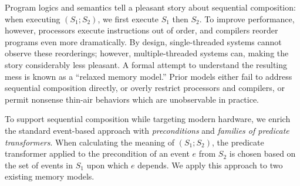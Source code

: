 
Program logics and semantics tell a pleasant story about sequential
composition: when executing $(S_1; S_2)$, we first execute $S_1$ then $S_2$.
To improve performance, however, processors execute instructions out of
order, and compilers reorder programs even more dramatically.  By design,
single-threaded systems cannot observe these reorderings; however,
multiple-threaded systems can, making the story considerably less pleasant.
A formal attempt to understand the resulting mess is known as a ``relaxed
memory model.''  Prior models either fail to address sequential composition
directly, or overly restrict processors and compilers, or permit nonsense
thin-air behaviors which are unobservable in practice.

To support sequential composition while targeting modern hardware, we enrich
the standard event-based approach with \emph{preconditions} and
\emph{families of predicate transformers}.
%
When calculating the meaning of $(S_1;S_2)$, the predicate transformer applied to the
precondition of an event $e$ from ${S_2}$ is chosen based on the set of
events in ${S_1}$ upon which $e$ depends.  We apply this approach to two
existing memory models.


\endinput


